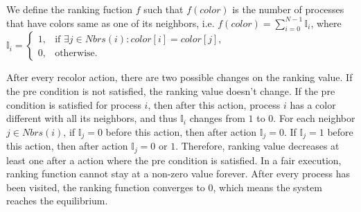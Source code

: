 \documentclass[11pt]{article}
\begin{document}
We define the ranking fuction $f$ such that $f(\mathit{color})$ is the number of processes that have colors same as one of its neighbors, i.e. $f(\mathit{color}) = \sum\limits_{i = 0}^{N-1} \mathbb{I}_i$, where $\mathbb{I}_i = \begin{cases} 1, &\mbox{if } \exists j \in Nbrs(i): color[i] = color[j],\\
0, & \mbox{otherwise}.\end{cases}$

After every recolor action, there are two possible changes on the ranking value. If the pre condition is not satisfied, the ranking value doesn't change. If the pre condition is satisfied for process $i$, then after this action, process $i$ has a color different with all its neighbors, and thus $\mathbb{I}_i$ changes from $1$ to $0$. For each neighbor $j \in Nbrs(i)$, if $\mathbb{I}_j = 0$ before this action, then after action $\mathbb{I}_j = 0$. If $\mathbb{I}_j = 1$ before this action, then after action $\mathbb{I}_j = 0 \text{ or } 1$. Therefore, ranking value decreases at least one after a action where the pre condition is satisfied. In a fair execution, ranking function cannot stay at a non-zero value forever. After every process has been visited, the ranking function converges to $0$, which means the system reaches the equilibrium.
\end{document}
